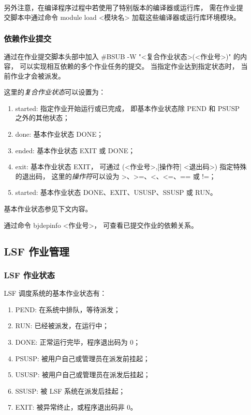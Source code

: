 \documentclass[UTF8]{ctexart}
\newcommand{\mynnote}[1]{\colorbox{gray!15}{\color{red}#1}}
\begin{document}
另外注意，在编译程序过程中若使用了特别版本的编译器或运行库，
需在作业提交脚本中通过命令 \mynnote{module load <模块名>}
加载这些编译器或运行库环境模块。

\subsubsection{依赖作业提交}
通过在作业提交脚本头部中加入 \mynnote{\#BSUB -W "<复合作业状态>(<作业号>)"} 的内容，
可以实现相互依赖的多个作业任务的提交。
当指定作业达到指定状态时，
当前作业才会被派发。

这里的{\em 复合作业状态}可以设置为：
\begin{enumerate}[\hspace{15mm}（1）]
  \item started: 指定作业开始运行或已完成，
    即基本作业状态除 PEND 和 PSUSP 之外的其他状态；
  \item done: 基本作业状态 DONE；
  \item ended: 基本作业状态 EXIT 或 DONE；
  \item exit: 基本作业状态 EXIT，
    可通过 \mynnote{(<作业号>,[操作符] <退出码>)} 指定特殊的退出码，
    这里的{\em 操作符}可以设为 >、>=、<、<=、== 或 !=；
  \item started: 基本作业状态 DONE、EXIT、USUSP、SSUSP 或 RUN。
\end{enumerate}
基本作业状态参见下文内容。

通过命令 \mynnote{bjdepinfo <作业号>}，
可查看已提交作业的依赖关系。

\subsection{LSF 作业管理}
\subsubsection{LSF 作业状态}
LSF 调度系统的基本作业状态有：
\begin{enumerate}[\hspace{15mm}（1）]
  \item PEND: 在系统中排队，等待派发；
  \item RUN: 已经被派发，在运行中；
  \item DONE: 正常运行完毕，程序退出码为 0；
  \item PSUSP: 被用户自己或管理员在派发前挂起；
  \item USUSP: 被用户自己或管理员在派发后挂起；
  \item SSUSP: 被 LSF 系统在派发后挂起；
  \item EXIT: 被异常终止，或程序退出码非 0。
\end{enumerate}
\end{document}
